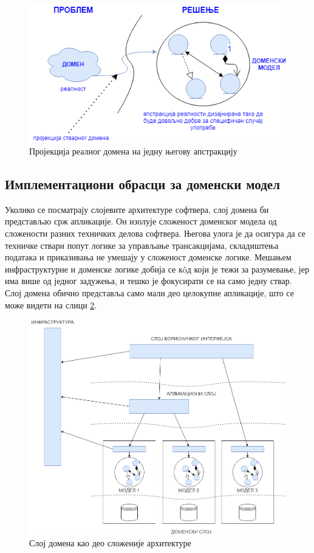 \documentclass[12pt,oneside]{memoir}
\begin{document}
\begin{figure}[!ht]
  \centering
  \includegraphics[scale=0.7]{slike/domen-model-projekcija.png}
  \caption{Пројекција реалног домена на једну његову апстракцију}
  \label{fig:domenmodelprojekcija}
\end{figure}
\subsection{Имплементациони обрасци за доменски модел}
Уколико се посматрају слојевите архитектуре софтвера, слој домена би представљао срж апликације. Он изолује сложеност доменског модела од сложености разних техничких делова софтвера. Његова улога је да осигура да се техничке ствари попут логике за управљање трансакцијама, складиштења података и приказивања не умешају у сложеност доменске логике. Мешањем инфраструктурне и доменске логике добија се кôд који је тежи за разумевање, јер има више од једног задужења, и тешко је фокусирати се на само једну ствар. Слој домена обично представља само мали део целокупне апликације, што се може видети на слици \ref{fig:slojevitaarhitektura}.

\begin{figure}[!ht]
  \centering
  \includegraphics[width=\textwidth]{slike/slojevita-arhitektura.png}
  \caption{Слој домена као део сложеније архитектуре}
  \label{fig:slojevitaarhitektura}
\end{figure}
\end{document}

